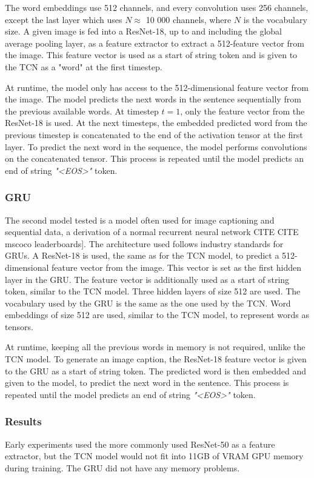 \documentclass[a4paper, twoside]{article}
\begin{document}
The word embeddings use 512 channels, and every convolution uses 256 channels, except the last layer which uses $N \approx $ 10 000 channels, where $N$ is the vocabulary size. A given image is fed into a ResNet-18, up to and including the global average pooling layer, as a feature extractor to extract a 512-feature vector from the image. This feature vector is used as a start of string token and is given to the TCN as a "word" at the first timestep.

At runtime, the model only has access to the 512-dimensional feature vector from the image. The model predicts the next words in the sentence sequentially from the previous available words. At timestep $t=1$, only the feature vector from the ResNet-18 is used. At the next timesteps, the embedded predicted word from the previous timestep is concatenated to the end of the activation tensor at the first layer. To predict the next word in the sequence, the model performs convolutions on the concatenated tensor. This process is repeated until the model predicts an end of string \textit{"<EOS>"} token.

\subsubsection{GRU}
The second model tested is a model often used for image captioning and sequential data, a derivation of a normal recurrent neural network \cite{cs231n} CITE CITE mscoco leaderboards]. The architecture used follows industry standards for GRUs. A ResNet-18 is used, the same as for the TCN model, to predict a 512-dimensional feature vector from the image. This vector is set as the first hidden layer in the GRU. The feature vector is additionally used as a start of string token, similar to the TCN model. Three hidden layers of size 512 are used. The vocabulary used by the GRU is the same as the one used by the TCN. Word embeddings of size 512 are used, similar to the TCN model, to represent words as tensors.

At runtime, keeping all the previous words in memory is not required, unlike the TCN model. To generate an image caption, the ResNet-18 feature vector is given to the GRU as a start of string token. The predicted word is then embedded and given to the model, to predict the next word in the sentence. This process is repeated until the model predicts an end of string \textit{"<EOS>"} token.

\subsubsection{Results}
Early experiments used the more commonly used ResNet-50 as a feature extractor, but the TCN model would not fit into 11GB of VRAM GPU memory during training. The GRU did not have any memory problems.
\end{document}
